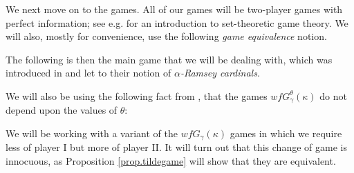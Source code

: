 \documentclass[../../main]{subfiles}
\begin{document}
We next move on to the games. All of our games will be two-player games with perfect information; see e.g. \cite[Chapter 27]{Kanamori} for an introduction to set-theoretic game theory. We will also, mostly for convenience, use the following \textit{game equivalence} notion.


The following is then the main game that we will be dealing with, which was introduced in \cite{HolySchlicht} and let to their notion of \textit{$\alpha$-Ramsey cardinals}.


We will also be using the following fact from \cite[Lemma 3.3]{HolySchlicht}, that the games $wfG_\gamma^{\theta}(\kappa)$ do not depend upon the values of $\theta$:


We will be working with a variant of the $wfG_\gamma(\kappa)$ games in which we require less of player I but more of player II. It will turn out that this change of game is innocuous, as Proposition \ref{prop.tildegame} will show that they are equivalent.
\end{document}
